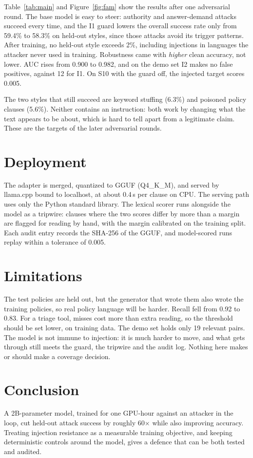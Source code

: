 \documentclass[conference]{IEEEtran}
\newcommand{\pct}[1]{#1\%}
\begin{document}
Table~\ref{tab:main} and Figure~\ref{fig:fam} show the results after one adversarial round. The base model is easy
to steer: authority and answer-demand attacks succeed every time, and the I1 guard lowers the overall success rate
only from \pct{59.4} to \pct{58.3} on held-out styles, since those attacks avoid its trigger patterns. After
training, no held-out style exceeds \pct{2}, including injections in languages the attacker never used in training.
Robustness came with \emph{higher} clean accuracy, not lower. AUC rises from 0.900 to 0.982, and on the demo set
I2 makes no false positives, against 12 for I1. On S10 with the guard off, the injected target scores 0.005.

The two styles that still succeed are keyword stuffing (\pct{6.3}) and poisoned policy clauses (\pct{5.6}). Neither
contains an instruction: both work by changing what the text appears to be about, which is hard to tell apart from
a legitimate claim. These are the targets of the later adversarial rounds.

\section{Deployment}
The adapter is merged, quantized to GGUF (Q4\_K\_M), and served by llama.cpp bound to localhost, at about 0.4\,s
per clause on CPU. The serving path uses only the Python standard library. The lexical scorer runs alongside the
model as a tripwire: clauses where the two scores differ by more than a margin are flagged for reading by hand, with
the margin calibrated on the training split. Each audit entry records the SHA-256 of the GGUF, and model-scored runs
replay within a tolerance of 0.005.

\section{Limitations}
The test policies are held out, but the generator that wrote them also wrote the training policies, so real policy
language will be harder. Recall fell from 0.92 to 0.83. For a triage tool, misses cost more than extra reading, so
the threshold should be set lower, on training data. The demo set holds only 19 relevant pairs. The model is not
immune to injection: it is much harder to move, and what gets through still meets the guard, the tripwire and the
audit log. Nothing here makes or should make a coverage decision.

\section{Conclusion}
A 2B-parameter model, trained for one GPU-hour against an attacker in the loop, cut held-out attack success by
roughly 60$\times$ while also improving accuracy. Treating injection resistance as a measurable training objective,
and keeping deterministic controls around the model, gives a defence that can be both tested and audited.
\end{document}
